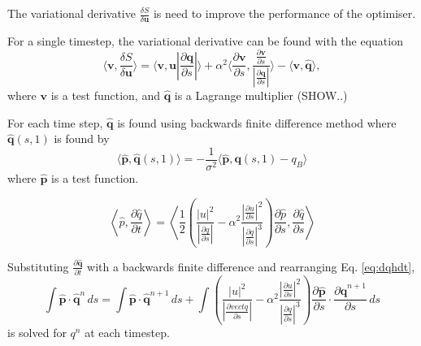 \documentclass[a4paper, 10pt]{article}
\newcommand{\eq}[1]{Eq. \ref{eq:#1}}
\newcommand{\vect}[1]{\ensuremath{\mathbf{#1}}}
\newcommand{\hvect}[1]{\ensuremath{\hat{\vect{#1}}}}
\newcommand{\pp}[2]{\frac{\partial #1}{\partial #2}}
\begin{document}
The variational derivative $\frac{\delta S}{\delta \vect u}$ is need to improve
the performance of the optimiser. 

For a single timestep, the variational derivative can be found with the equation
\begin{equation}
  \label{eq:dsdu}
  \langle \vect v, \frac{\delta S}{\delta \vect u}\rangle =
  \langle \vect v, \vect u \left| \frac{\partial \vect q}{\partial s}\right |\rangle 
  + \alpha^2 \langle \frac{\partial \vect v}{\partial s},
  \frac{\frac{\partial \vect v}{\partial s} }{ \left|\frac{\partial \vect q}{\partial s}\right|}
\rangle - \langle \vect v, \hvect{q} \rangle,
\end{equation}
where $\vect v$ is a test function, and $\hvect q$ is a Lagrange multiplier (SHOW..)

For each time step, $\hvect q$ is found using backwards finite difference method
where $\hvect q(s,1)$ is found by
\begin{equation}
  \label{eq:qh1}
  \langle \hvect p, \hvect q(s,1) \rangle = - \frac{1}{\sigma^2}
  \langle \hvect p, \vect q(s,1) - q_B \rangle
\end{equation}
where $\hvect p$ is a test function.


\begin{equation}
  \label{eq:dqhdt}
  \left\langle \hat{p},\pp{\hat{q}}{t}\right\rangle = \left\langle \frac{1}{2}\left(
      \frac{|u|^2}{\left|\pp{q}{s}\right|}
      -\alpha^2\frac{\left|\pp{u}{s}\right|^2}{\left|\pp{q}{s}\right|^3}\right)
    \pp{\hat{p}}{s},\pp{\hat{q}}{s}\right\rangle 
\end{equation}




Substituting $\frac{\partial \hvect q}{\partial t}$ with a backwards finite difference and
rearranging \eq{dqhdt},
\begin{equation}
  \label{eq:fd_qh}
  \int \hvect p \cdot \hvect q^n \,ds = \int \hvect p \cdot \hvect q^{n+1} \,ds
  + \int
   \left( 
      \frac{|u|^2}{\left|\pp{vect q}{s}\right|}
      -\alpha^2\frac{\left|\pp{u}{s}\right|^2}{\left|\pp{q}{s}\right|^3}
  \right) \frac{ \partial \hvect p}{\partial s} 
  \cdot \frac{\partial \hvect q^{n+1}}{\partial s}\,ds
\end{equation}
is solved for $q^n$ at each timestep.
\end{document}
